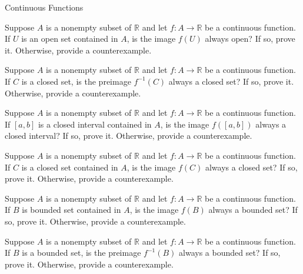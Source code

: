 \begin{section}{Continuous Functions}
\begin{problem}
Suppose $A$ is a nonempty subset of $\mathbb{R}$ and let $f:A\to \mathbb{R}$ be a continuous function. If $U$ is an open set contained in $A$, is the image $f(U)$ always open?  If so, prove it.  Otherwise, provide a counterexample.
\end{problem}


\begin{problem}
Suppose $A$ is a nonempty subset of $\mathbb{R}$ and let $f:A\to \mathbb{R}$ be a continuous function. If $C$ is a closed set, is the preimage $f^{-1}(C)$ always a closed set? If so, prove it.  Otherwise, provide a counterexample.
\end{problem}

\begin{problem}
Suppose $A$ is a nonempty subset of $\mathbb{R}$ and let $f:A\to \mathbb{R}$ be a continuous function. If $[a,b]$ is a closed interval contained in $A$, is the image $f([a,b])$ always a closed interval?  If so, prove it.  Otherwise, provide a counterexample.
\end{problem}

\begin{problem}
Suppose $A$ is a nonempty subset of $\mathbb{R}$ and let $f:A\to \mathbb{R}$ be a continuous function. If $C$ is a closed set contained in $A$, is the image $f(C)$ always a closed set?  If so, prove it.  Otherwise, provide a counterexample.
\end{problem}

\begin{problem}
Suppose $A$ is a nonempty subset of $\mathbb{R}$ and let $f:A\to \mathbb{R}$ be a continuous function. If $B$ is bounded set contained in $A$, is the image $f(B)$ always a bounded set?  If so, prove it.  Otherwise, provide a counterexample.
\end{problem}

\begin{problem}
Suppose $A$ is a nonempty subset of $\mathbb{R}$ and let $f:A\to \mathbb{R}$ be a continuous function. If $B$ is a bounded set, is the preimage $f^{-1}(B)$ always a bounded set? If so, prove it.  Otherwise, provide a counterexample.
\end{problem}


\end{section}
